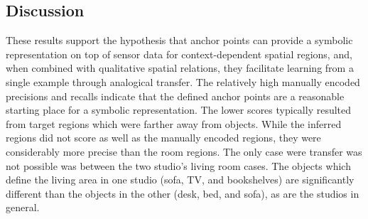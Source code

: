 
\subsection{Discussion}

These results support the hypothesis that anchor points can provide a symbolic representation on top of sensor data for context-dependent spatial regions, and, when combined with qualitative spatial relations, they facilitate learning from a single example through analogical transfer. The relatively high manually encoded precisions and recalls indicate that the defined anchor points are a reasonable starting place for a symbolic representation. The lower scores typically resulted from target regions which were farther away from objects. While the inferred regions did not score as well as the manually encoded regions, they were considerably more precise than the room regions. The only case were transfer was not possible was between the two studio's living room cases. The objects which define the living area in one studio (sofa, TV, and bookshelves) are significantly different than the objects in the other (desk, bed, and sofa), as are the studios in general.

